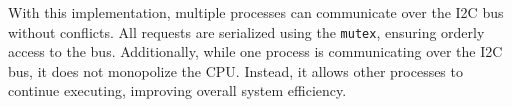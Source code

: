With this implementation, multiple processes can communicate over the I2C bus without
conflicts. All requests are serialized using the \lstinline[style=myagc]|mutex|,
ensuring orderly access to the bus. Additionally, while one process is communicating
over the I2C bus, it does not monopolize the CPU. Instead, it allows other processes to
continue executing, improving overall system efficiency.


